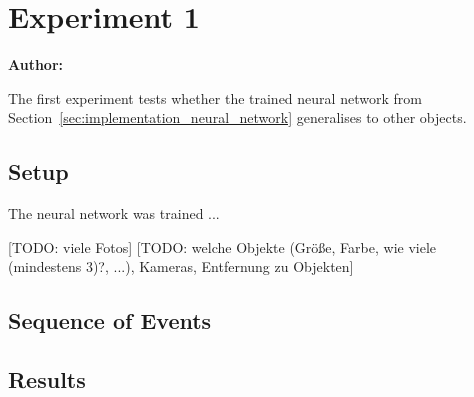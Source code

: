 \chapter{Experiment 1}

\textbf{Author: } 

The first experiment tests whether the trained neural network from Section~\ref{sec:implementation_neural_network} generalises to other objects.

\section{Setup}
The neural network was trained ...

[TODO: viele Fotos]
[TODO: welche Objekte (Größe, Farbe, wie viele (mindestens 3)?, ...), Kameras, Entfernung zu Objekten]

\section{Sequence of Events}

\section{Results}

\filbreak